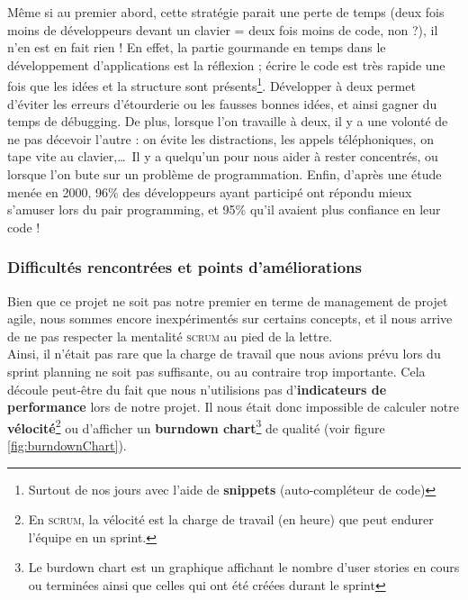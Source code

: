 Même si au premier abord, cette stratégie parait une perte de temps (deux fois moins de développeurs devant un clavier = deux fois moins de code, non ?), il n'en est en fait rien ! En effet, la partie gourmande en temps dans le développement d'applications est la réflexion ; écrire le code est très rapide une fois que les idées et la structure sont présents\footnote{Surtout de nos jours avec l'aide de \textbf{snippets} (auto-compléteur de code)}. Développer à deux permet d'éviter les erreurs d'étourderie ou les fausses bonnes idées, et ainsi gagner du temps de débugging. De plus, lorsque l'on travaille à deux, il y a une volonté de ne pas décevoir l'autre : on évite les distractions, les appels téléphoniques, on tape vite au clavier,\dots~Il y a quelqu'un pour nous aider à rester concentrés, ou lorsque l'on bute sur un problème de programmation. Enfin, d'après une étude menée en 2000, 96\% des développeurs ayant participé ont répondu mieux s'amuser lors du pair programming, et 95\% qu'il avaient plus confiance en leur code !~\cite{Williams00strengtheningthe}

\subsubsection*{Difficultés rencontrées et points d'améliorations}

Bien que ce projet ne soit pas notre premier en terme de management de projet agile, nous sommes encore inexpérimentés sur certains concepts, et il nous arrive de ne pas respecter la mentalité \textsc{scrum} au pied de la lettre.\\

Ainsi, il n'était pas rare que la charge de travail que nous avions prévu lors du sprint planning ne soit pas suffisante, ou au contraire trop importante. Cela découle peut-être du fait que nous n'utilisions pas d'\textbf{indicateurs de performance} lors de notre projet. Il nous était donc impossible de calculer notre \textbf{vélocité}\footnote{En \textsc{scrum}, la vélocité est la charge de travail (en heure) que peut endurer l'équipe en un sprint.} ou d'afficher un \textbf{burndown chart}\footnote{Le burdown chart est un graphique affichant le nombre d'user stories en cours ou terminées ainsi que celles qui ont été créées durant le sprint} de qualité (voir figure \ref{fig:burndownChart}).\\

